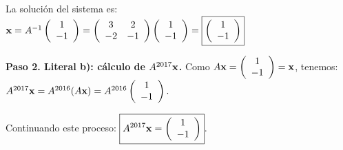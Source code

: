 \begin{prob}
\begin{myproof}
La solución del sistema es: ${\bf x} = A^{-1} \left( \begin{array}{c} 1 \\ -1 \end{array} \right) = \left( \begin{array}{cc} 3 & 2 \\ -2 & -1 \end{array} \right) \left( \begin{array}{c} 1 \\ -1 \end{array} \right) = \boxed{\left( \begin{array}{c} 1 \\ -1 \end{array} \right)}$

\textbf{Paso 2. Literal b): cálculo de $A^{2017}{\bf x}$.} Como $A{\bf x} = \left( \begin{array}{c} 1 \\ -1 \end{array} \right) = {\bf x}$, tenemos: $A^{2017}{\bf x} = A^{2016}(A{\bf x}) = A^{2016} \left( \begin{array}{c} 1 \\ -1 \end{array} \right).$

Continuando este proceso: $\boxed{A^{2017}{\bf x} = \left( \begin{array}{c} 1 \\ -1 \end{array} \right)}.$
\end{myproof}
\end{prob}

